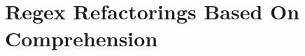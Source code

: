 \section{Regex Refactorings Based On Comprehension}
\label{sec:comprehensionRefactorings}




% 




